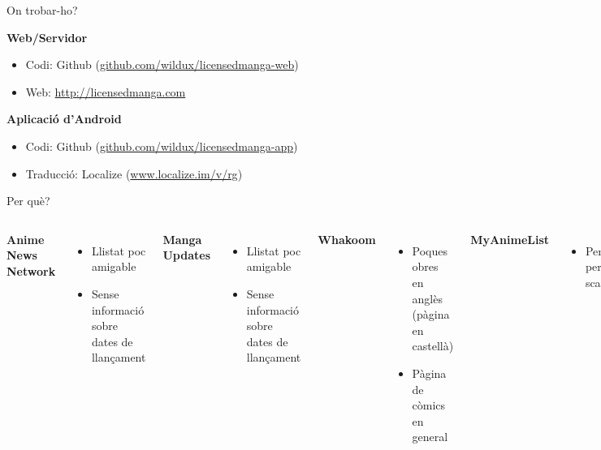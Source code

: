 \documentclass{beamer}
\begin{document}
	\begin{frame}{On trobar-ho?}

		\large\textbf{Web/Servidor}
		\begin{itemize}
			\item Codi: Github (\href{https://github.com/wildux/licensedmanga-web}{github.com/wildux/licensedmanga-web})
			\item Web: \url{http://licensedmanga.com}
		\end{itemize}
			\vspace{1em}
			\large\textbf{Aplicació d'Android}
		\begin{itemize}
			\item Codi: Github (\href{https://github.com/wildux/licensedmanga-app}{github.com/wildux/licensedmanga-app})
			\item Traducció: Localize (\href{http://www.localize.im/v/rg}{www.localize.im/v/rg})
		\end{itemize}

	\end{frame}

	\begin{frame}{Per què?}

		\begin{columns}[t]
			\large\textbf{Anime News Network}
			\begin{itemize}
				\small\item Llistat poc amigable
				\item Sense informació sobre dates de llançament
			\end{itemize}
			\vspace{1em}
			\large\textbf{Manga Updates}
			\begin{itemize}
				\small\item Llistat poc amigable
				\item Sense informació sobre dates de llançament
			\end{itemize}
			\large\textbf{Whakoom}
			\begin{itemize}
				\small\item Poques obres en anglès (pàgina en castellà)
				\item Pàgina de còmics en general
			\end{itemize}
			\vspace{1em}
			\large\textbf{MyAnimeList}
			\begin{itemize}
				\small\item Pensada per scans
			\end{itemize}
		\end{columns}

	\end{frame}
\end{document}
